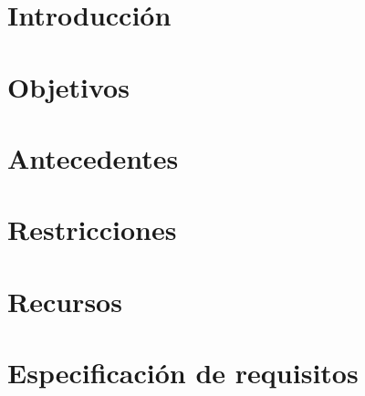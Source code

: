\documentclass[a4paper,12pt]{book}
\let\origdoublepage\cleardoublepage
\newcommand{\clearemptydoublepage}{%
  \clearpage
{\pagestyle{empty}\origdoublepage}%
}
\let\cleardoublepage\clearemptydoublepage
\begin{document}

   
   \cleardoublepage
   

   \setcounter{page}{0}
   \cleardoublepage

   \tableofcontents

   \chapter{Introducción}
      
      
      

   \chapter{Objetivos}\label{objetivos}
      
      

   \chapter{Antecedentes}
      
      
      

   \chapter{Restricciones}
      
      

   \chapter{Recursos}\label{recursos}
      
      
      

   \chapter{Especificación de requisitos}\label{espReq}
      
      
      
\end{document}
